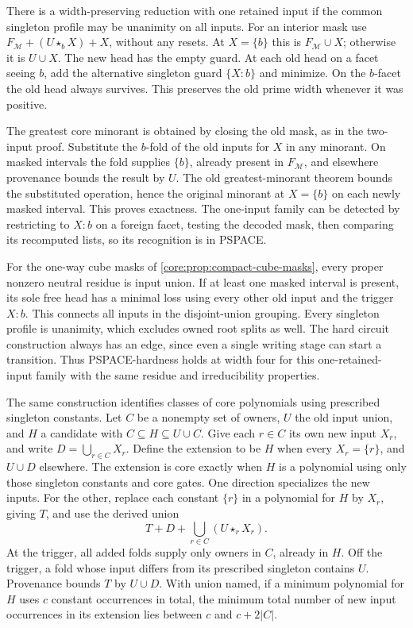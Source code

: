 There is a width-preserving reduction with one
retained input if the common singleton profile may
be unanimity on all inputs. For an interior mask
use $F_{\mathcal M}+(U\star_b X)+X$, without any
resets. At $X=\{b\}$ this is $F_{\mathcal M}\cup X$;
otherwise it is $U\cup X$. The new head has the
empty guard. At each old head on a facet seeing
$b$, add the alternative singleton guard
$\{X:b\}$ and minimize. On the $b$-facet the old
head always survives. This preserves the old
prime width whenever it was positive.

The greatest core minorant is obtained by closing
the old mask, as in the two-input proof. Substitute
the $b$-fold of the old inputs for $X$ in any
minorant. On masked intervals the fold supplies
$\{b\}$, already present in $F_{\mathcal M}$, and
elsewhere provenance bounds the result by $U$.
The old greatest-minorant theorem bounds the
substituted operation, hence the original minorant
at $X=\{b\}$ on each newly masked interval. This
proves exactness. The one-input family can be
detected by restricting to $X:b$ on a foreign facet,
testing the decoded mask, then comparing its
recomputed lists, so its recognition is in PSPACE.

For the one-way cube masks of
\cref{core:prop:compact-cube-masks}, every proper
nonzero neutral residue is input union. If at
least one masked interval is present, its sole
free head has a minimal loss using every other
old input and the trigger $X:b$. This connects all
inputs in the disjoint-union grouping. Every
singleton profile is unanimity, which excludes
owned root splits as well. The hard circuit
construction always has an edge, since even a
single writing stage can start a transition.
Thus PSPACE-hardness holds at width four for this
one-retained-input family with the same residue
and irreducibility properties.

The same construction identifies classes of core
polynomials using prescribed singleton constants.
Let $C$ be a nonempty set of owners, $U$ the old
input union, and $H$ a candidate with
$C\subseteq H\subseteq U\cup C$. Give each $r\in C$
its own new input $X_r$, and write $D=\bigcup_{r\in C}X_r$.
Define the extension to be $H$ when every $X_r=\{r\}$,
and $U\cup D$ elsewhere. The extension is core
exactly when $H$ is a polynomial using only those
singleton constants and core gates. One direction
specializes the new inputs. For the other, replace
each constant $\{r\}$ in a polynomial for $H$ by
$X_r$, giving $T$, and use the derived union
\[
 T + D + \bigcup_{r\in C}(U\star_r X_r).
\]
At the trigger, all added folds supply only owners
in $C$, already in $H$. Off the trigger, a fold
whose input differs from its prescribed singleton
contains $U$. Provenance bounds $T$ by $U\cup D$.
With union named, if a minimum polynomial for $H$
uses $c$ constant occurrences in total, the
minimum total number of new input occurrences in
its extension lies between $c$ and $c+2|C|$.

